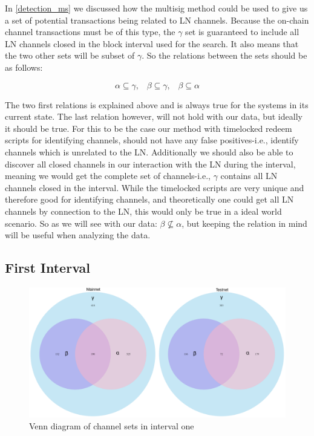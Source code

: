In \cref{detection_ms} we discussed how the multisig method could be used to give us a set of potential transactions being related to LN channels. Because the on-chain channel transactions must be of this type, the \( \gamma \) set is guaranteed to include all LN channels closed in the block interval used for the search. It also means that the two other sets will be subset of \( \gamma \). So the relations between the sets should be as follows:

\begin{equation} \label{eq:1}
      \alpha \subseteq \gamma, \hspace{10pt} \beta \subseteq \gamma, \hspace{10pt} \beta \subseteq \alpha  
\end{equation}

The two first relations is explained above and is always true for the systems in its current state. The last relation however, will not hold with our data, but ideally it should be true. For this to be the case our method with timelocked redeem scripts for identifying channels, should not have any false positives-i.e., identify channels which is unrelated to the LN. Additionally we should also be able to discover all closed channels in our interaction with the LN during the interval, meaning we would get the complete set of channels-i.e., \( \gamma \) contains all LN channels closed in the interval. While the timelocked scripts are very unique and therefore good for identifying channels, and theoretically one could get all LN channels by connection to the LN, this would only be true in a ideal world scenario. So as we will see with our data: \( \beta \not\subseteq \alpha \), but keeping the relation in mind will be useful when analyzing the data.

\subsection{First Interval}

\begin{figure}[ht]
    \centering
    \includegraphics[width=16cm]{figures/graphs/venn_full.png}
    \caption{Venn diagram of channel sets in interval one}
    \label{fig:venn_run1}
\end{figure}

